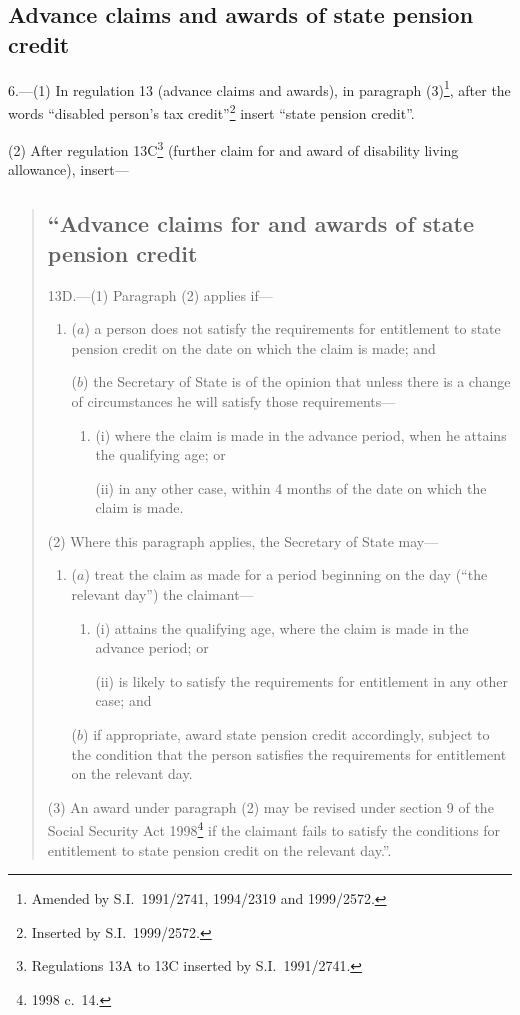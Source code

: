 \documentclass[12pt,a4paper]{article}
\begin{document}
\subsection[6. Advance claims and awards of state pension credit]{Advance claims and awards of state pension credit}

6.---(1)  In regulation 13 (advance claims and awards), in paragraph (3)\footnote{Amended by S.I.\ 1991/2741, 1994/2319 and 1999/2572.}, after the words “disabled person’s tax credit”\footnote{Inserted by S.I.\ 1999/2572.} insert “state pension credit”.

(2) After regulation 13C\footnote{Regulations 13A to 13C inserted by S.I.\ 1991/2741.} (further claim for and award of disability living allowance), insert—
\begin{quotation}
\subsection*{\sloppy “Advance claims for and awards of state pension credit}

13D.---(1)  Paragraph (2) applies if—
\begin{enumerate}\item[]
($a$) a person does not satisfy the requirements for entitlement to state pension credit on the date on which the claim is made; and

($b$) the Secretary of State is of the opinion that unless there is a change of circumstances he will satisfy those requirements—
\begin{enumerate}\item[]
(i) where the claim is made in the advance period, when he attains the qualifying age; or

(ii) in any other case, within 4 months of the date on which the claim is made.
\end{enumerate}
\end{enumerate}

(2) Where this paragraph applies, the Secretary of State may—
\begin{enumerate}\item[]
($a$) treat the claim as made for a period beginning on the day (“the relevant day”) the claimant—
\begin{enumerate}\item[]
(i) attains the qualifying age, where the claim is made in the advance period; or

(ii) is likely to satisfy the requirements for entitlement in any other case; and
\end{enumerate}

($b$) if appropriate, award state pension credit accordingly, subject to the condition that the person satisfies the requirements for entitlement on the relevant day.
\end{enumerate}

(3) An award under paragraph (2) may be revised under section 9 of the Social Security Act 1998\footnote{1998 c.\ 14.} if the claimant fails to satisfy the conditions for entitlement to state pension credit on the relevant day.”.
\end{quotation}
\end{document}
